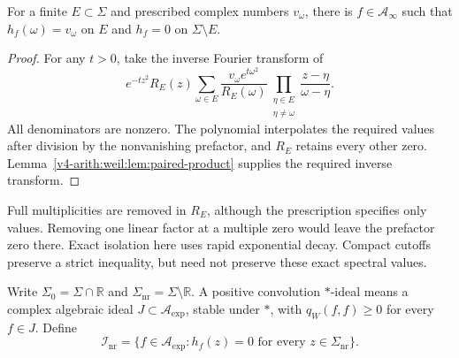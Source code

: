 \begin{theorem}
\label{v4-arith:weil:thm:isolation}
For a finite \(E\subset\Sigma\) and prescribed complex numbers
\(v_\omega\), there is \(f\in\mathscr A_\infty\) such that
\(h_f(\omega)=v_\omega\) on \(E\) and \(h_f=0\) on
\(\Sigma\setminus E\).
\end{theorem}
\begin{proof}
For any \(t>0\), take the inverse Fourier transform of
\begin{equation}
 e^{-tz^2}R_E(z)
 \sum_{\omega\in E}\frac{v_\omega e^{t\omega^2}}{R_E(\omega)}
        \prod_{\substack{\eta\in E\\\eta\ne\omega}}
                          \frac{z-\eta}{\omega-\eta}.
 \label{v4-arith:weil:eq:isolation}
\end{equation}
All denominators are nonzero. The polynomial interpolates the required
values after division by the nonvanishing prefactor, and \(R_E\) retains
every other zero. Lemma~\ref{v4-arith:weil:lem:paired-product} supplies
the required inverse transform.
\end{proof}

Full multiplicities are removed in \(R_E\), although the prescription
specifies only values. Removing one linear factor at a multiple zero
would leave the prefactor zero there. Exact isolation here uses rapid
exponential decay. Compact cutoffs preserve a strict inequality, but
need not preserve these exact spectral values.

Write \(\Sigma_0=\Sigma\cap\mathbb R\) and
\(\Sigma_{\mathrm{nr}}=\Sigma\setminus\mathbb R\).
A positive convolution \(*\)-ideal means a complex algebraic ideal
\(J\subset\mathscr A_{\exp}\), stable under \(*\), with
\(q_W(f,f)\ge0\) for every \(f\in J\).
Define
\[
 \mathcal I_{\mathrm{nr}}=
 \{f\in\mathscr A_{\exp}:h_f(z)=0
                         \text{ for every }z\in\Sigma_{\mathrm{nr}}\}.
\]

